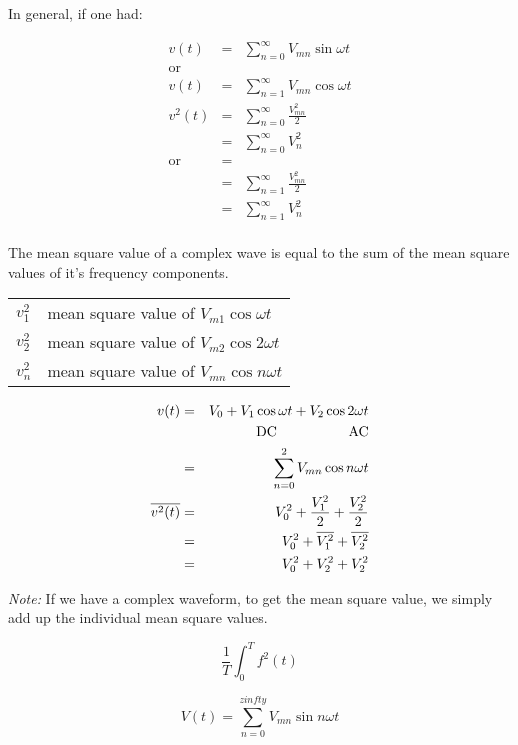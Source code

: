 \documentclass[a4paper,12pt]{article}
\begin{document}
In general, if one had:

\begin{eqnarray*}
	v(t) & = & \sum^{\infty}_{n = 0} V_{mn} \sin{\omega t} \\
	\mbox{or} & & \\
	v(t) & = & \sum^{\infty}_{n = 1} V_{mn} \cos{\omega t} \\
	v^{2}(t) & = & \sum^{\infty}_{n = 0} \frac{V_{mn}^{2}}{2} \\
				& = & \sum^{\infty}_{n = 0} V_{n}^{2} \\
	\mbox{or}& = & \\
				& = & \sum^{\infty}_{n = 1} \frac{V_{mn}^{2}}{2} \\
				& = & \sum^{\infty}_{n = 1} V_{n}^{2} \\
\end{eqnarray*}

The mean square value of a complex wave is equal to the sum of
the mean square values of it's frequency components.

\begin{tabular}{ll}
$v_{1}^{2}$	& mean square value of $V_{m1} \cos{\omega t}$ \\
$v_{2}^{2}$ & mean square value of $V_{m2} \cos{2 \omega t}$ \\
$v_{n}^{2}$ & mean square value of $V_{mn} \cos{n \omega t}$ \\
\end{tabular}

\begin{eqnarray*}
v(t) & = & V_{0} + V_{1} \cos{\omega t} + V_{2} \cos{2 \omega t} \\
	  &   &	\mbox{DC}	\hspace{18mm} \mbox{AC} \\
	  & = & \sum^{2}_{n = 0} V_{mn} \cos{n \omega t} \\
\overline{v^{2}(t)} & = & V_{0}^{2} + \frac{V_{1}^{2}}{2} + \frac{V_{2}^{2}}{2} \\
						  & = & V_{0}^{2} + \overline{V_{1}^{2}} + \overline{V_{2}^{2}} \\
 						  & = & V_{0}^{2} + V_{2}^{2} + V_{2}^{2}
\end{eqnarray*}

\emph{Note:} If we have a complex waveform, to get the mean
square value, we simply add up the individual mean square values.

\[ \frac{1}{T} \int^{T}_{0} f^{2} (t) \]

\[ V(t) = \sum^{zinfty}_{n = 0} V_{mn} \sin{n \omega t} \]
\end{document}

